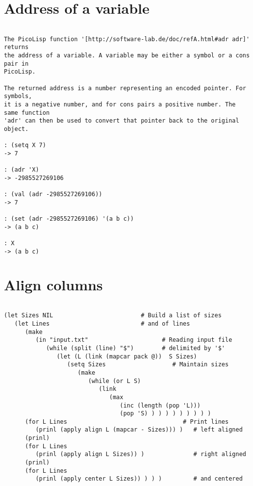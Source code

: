 \section*{Address of a variable}

\begin{verbatim}

The PicoLisp function '[http://software-lab.de/doc/refA.html#adr adr]' returns
the address of a variable. A variable may be either a symbol or a cons pair in
PicoLisp.

The returned address is a number representing an encoded pointer. For symbols,
it is a negative number, and for cons pairs a positive number. The same function
'adr' can then be used to convert that pointer back to the original object.

: (setq X 7)
-> 7

: (adr 'X)
-> -2985527269106

: (val (adr -2985527269106))
-> 7

: (set (adr -2985527269106) '(a b c))
-> (a b c)

: X
-> (a b c)

\end{verbatim}

\section*{Align columns}

\begin{verbatim}

(let Sizes NIL                         # Build a list of sizes
   (let Lines                          # and of lines
      (make
         (in "input.txt"                     # Reading input file
            (while (split (line) "$")        # delimited by '$'
               (let (L (link (mapcar pack @))  S Sizes)
                  (setq Sizes                   # Maintain sizes
                     (make
                        (while (or L S)
                           (link
                              (max
                                 (inc (length (pop 'L)))
                                 (pop 'S) ) ) ) ) ) ) ) ) )
      (for L Lines                                 # Print lines
         (prinl (apply align L (mapcar - Sizes))) )   # left aligned
      (prinl)
      (for L Lines
         (prinl (apply align L Sizes)) )              # right aligned
      (prinl)
      (for L Lines
         (prinl (apply center L Sizes)) ) ) )         # and centered

\end{verbatim}

